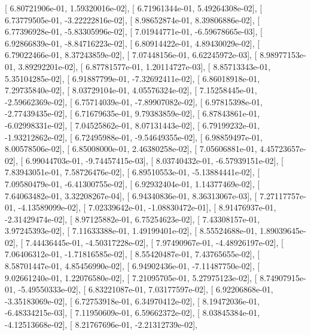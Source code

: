 \documentclass{article}
\begin{document}
       [  6.80721906e-01,   1.59320016e-02],
       [  6.71961344e-01,   5.49264308e-02],
       [  6.73779505e-01,  -3.22222816e-02],
       [  8.98652874e-01,   8.39806886e-02],
       [  6.77396928e-01,  -5.83305996e-02],
       [  7.01944771e-01,  -6.59678665e-03],
       [  6.92866839e-01,  -8.84716223e-02],
       [  6.80914422e-01,   4.89430029e-02],
       [  6.79022466e-01,   8.37243859e-02],
       [  7.07448156e-01,   6.62245972e-03],
       [  8.98977153e-01,   3.89292201e-02],
       [  6.87781577e-01,   1.20114727e-03],
       [  8.85713343e-01,   5.35104285e-02],
       [  6.91887799e-01,  -7.32692411e-02],
       [  6.86018918e-01,   7.29735840e-02],
       [  8.03729104e-01,   4.05576324e-02],
       [  7.15258445e-01,  -2.59662369e-02],
       [  6.75714039e-01,  -7.89907082e-02],
       [  6.97815398e-01,  -2.77439435e-02],
       [  6.71679635e-01,   9.79383859e-02],
       [  6.87843861e-01,  -6.02998331e-02],
       [  7.04525862e-01,   8.07131443e-02],
       [  6.79199232e-01,  -1.93212862e-02],
       [  6.72495988e-01,  -9.54649355e-02],
       [  6.98859497e-01,   8.00578506e-02],
       [  6.85008000e-01,   2.46380258e-02],
       [  7.05606881e-01,   4.45723657e-02],
       [  6.99044703e-01,  -9.74457415e-03],
       [  8.03740432e-01,  -6.57939151e-02],
       [  7.83943051e-01,   7.58726476e-02],
       [  6.89510553e-01,  -5.13884441e-02],
       [  7.09580479e-01,  -6.41300755e-02],
       [  6.92932404e-01,   1.14377469e-02],
       [  7.64063482e-01,   3.32208267e-04],
       [  6.94340836e-01,   8.36313067e-03],
       [  7.27117757e-01,  -4.13589099e-02],
       [  7.02339642e-01,  -1.08830472e-01],
       [  8.91476937e-01,  -2.31429474e-02],
       [  8.97125882e-01,   6.75254623e-02],
       [  7.43308157e-01,   3.97245393e-02],
       [  7.11633388e-01,   1.49199401e-02],
       [  8.55524688e-01,   1.89039645e-02],
       [  7.44436445e-01,  -4.50317228e-02],
       [  7.97490967e-01,  -4.48926197e-02],
       [  7.06406312e-01,  -1.71816585e-02],
       [  8.55420487e-01,   7.43765655e-02],
       [  8.58701447e-01,   4.85456990e-02],
       [  6.94902436e-01,  -7.11487750e-02],
       [  9.02661240e-01,   1.22076580e-02],
       [  7.21095705e-01,   5.27975123e-02],
       [  8.74907915e-01,  -5.49550333e-02],
       [  6.83221087e-01,   7.03177597e-02],
       [  6.92206868e-01,  -3.35183069e-02],
       [  6.72753918e-01,   6.34970412e-02],
       [  8.19472036e-01,  -6.48334215e-03],
       [  7.11950609e-01,   6.59662372e-02],
       [  8.03845384e-01,  -4.12513668e-02],
       [  8.21767696e-01,  -2.21312739e-02],
\end{document}
